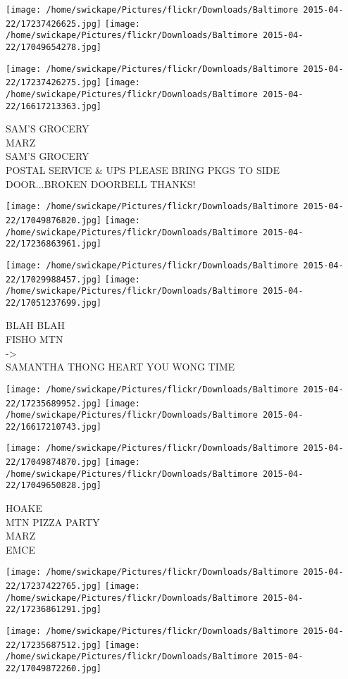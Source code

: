 \documentclass[10pt,letterpaper]{article}
\begin{document}
\texttt{[image: /home/swickape/Pictures/flickr/Downloads/Baltimore 2015-04-22/17237426625.jpg]}
\texttt{[image: /home/swickape/Pictures/flickr/Downloads/Baltimore 2015-04-22/17049654278.jpg]}

\texttt{[image: /home/swickape/Pictures/flickr/Downloads/Baltimore 2015-04-22/17237426275.jpg]}
\texttt{[image: /home/swickape/Pictures/flickr/Downloads/Baltimore 2015-04-22/16617213363.jpg]}

SAM'S GROCERY\\
MARZ\\
SAM'S GROCERY\\
POSTAL SERVICE \& UPS PLEASE BRING PKGS TO SIDE DOOR...BROKEN DOORBELL THANKS!
\pagebreak

\texttt{[image: /home/swickape/Pictures/flickr/Downloads/Baltimore 2015-04-22/17049876820.jpg]}
\texttt{[image: /home/swickape/Pictures/flickr/Downloads/Baltimore 2015-04-22/17236863961.jpg]}

\texttt{[image: /home/swickape/Pictures/flickr/Downloads/Baltimore 2015-04-22/17029988457.jpg]}
\texttt{[image: /home/swickape/Pictures/flickr/Downloads/Baltimore 2015-04-22/17051237699.jpg]}

BLAH BLAH\\
FISHO MTN\\
{-}>\\
SAMANTHA THONG HEART YOU WONG TIME
\pagebreak

\texttt{[image: /home/swickape/Pictures/flickr/Downloads/Baltimore 2015-04-22/17235689952.jpg]}
\texttt{[image: /home/swickape/Pictures/flickr/Downloads/Baltimore 2015-04-22/16617210743.jpg]}

\texttt{[image: /home/swickape/Pictures/flickr/Downloads/Baltimore 2015-04-22/17049874870.jpg]}
\texttt{[image: /home/swickape/Pictures/flickr/Downloads/Baltimore 2015-04-22/17049650828.jpg]}

HOAKE\\
MTN PIZZA PARTY\\
MARZ\\
EMCE
\pagebreak

\texttt{[image: /home/swickape/Pictures/flickr/Downloads/Baltimore 2015-04-22/17237422765.jpg]}
\texttt{[image: /home/swickape/Pictures/flickr/Downloads/Baltimore 2015-04-22/17236861291.jpg]}

\texttt{[image: /home/swickape/Pictures/flickr/Downloads/Baltimore 2015-04-22/17235687512.jpg]}
\texttt{[image: /home/swickape/Pictures/flickr/Downloads/Baltimore 2015-04-22/17049872260.jpg]}
\end{document}
